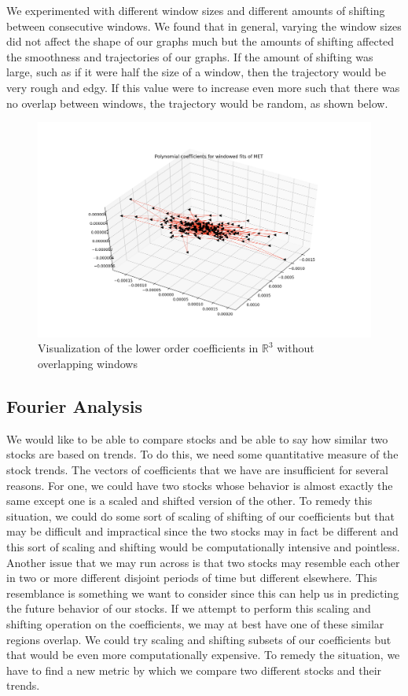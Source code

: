 \documentclass[final]{article}
\begin{document}
We experimented with different window sizes and different amounts of shifting
between consecutive windows. We found that in general, varying the window sizes
did not affect the shape of our graphs much but the amounts of shifting
affected the smoothness and trajectories of our graphs. If the amount of
shifting was large, such as if it were half the size of a window, then the
trajectory would be very rough and edgy. If this value were to increase even
more such that there was no overlap between windows, the trajectory would be
random, as shown below.

\begin{figure}[H]
  \centering
  \includegraphics[width=\linewidth]{img/coeff3}
  \caption{Visualization of the lower order coefficients in $\mathbb{R}^3$
  without overlapping windows}
  \label{fig:coeff}
\end{figure}

\subsection{Fourier Analysis}

We would like to be able to compare stocks and be able to say how similar two
stocks are based on trends. To do this, we need some quantitative measure of
the stock trends. The vectors of coefficients that we have are insufficient for
several reasons. For one, we could have two stocks whose behavior is almost
exactly the same except one is a scaled and shifted version of the other. To
remedy this situation, we could do some sort of scaling of shifting of our
coefficients but that may be difficult and impractical since the two stocks may
in fact be different and this sort of scaling and shifting would be
computationally intensive and pointless. Another issue that we may run across
is that two stocks may resemble each other in two or more different disjoint
periods of time but different elsewhere. This resemblance is something we want
to consider since this can help us in predicting the future behavior of our
stocks. If we attempt to perform this scaling and shifting operation on the
coefficients, we may at best have one of these similar regions overlap. We
could try scaling and shifting subsets of our coefficients but that would be
even more computationally expensive. To remedy the situation, we have to find a
new metric by which we compare two different stocks and their trends.
\end{document}
